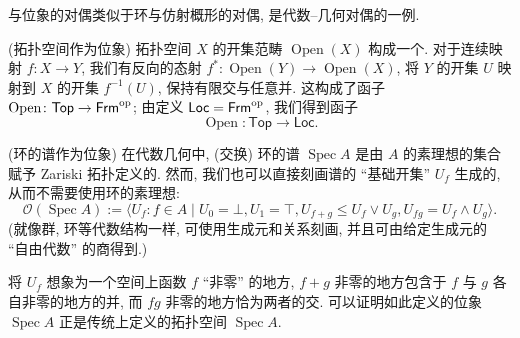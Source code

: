\begin{remark}
	{}
	\fm{}与位象的对偶类似于环与仿射概形的对偶,
	是代数--几何对偶的一例.
\end{remark}

\begin{example}
	{(拓扑空间作为位象)}
	拓扑空间 $X$ 的开集范畴 $\operatorname{Open}(X)$ 构成一个\fm{}.
	对于连续映射 $f \colon X \to Y$,
	我们有反向的\fm{}态射 $f^* \colon \operatorname{Open}(Y) \to \operatorname{Open}(X)$,
	将 $Y$ 的开集 $U$ 映射到 $X$ 的开集 $f^{-1}(U)$, 保持有限交与任意并.
	这构成了函子 $\operatorname{Open} \colon \mathsf {Top} \to \mathsf {Frm}^{\text{op}}$; 由定义 $\mathsf {Loc} = \mathsf {Frm}^{\text{op}}$, 我们得到函子 $$\operatorname{Open} \colon \mathsf {Top} \to \mathsf {Loc}.$$
\end{example}

\begin{example}
	{(环的谱作为位象)}
	在代数几何中, (交换) 环的谱 $\operatorname{Spec}A$ 是由 $A$ 的素理想的集合赋予 Zariski 拓扑定义的. 然而, 我们也可以直接刻画谱的 ``基础开集'' $U_f$ 生成的\fm, 从而不需要使用环的素理想\footnotemark:
	$$
	\mathcal O(\operatorname{Spec}A):= \big\langle U_f\colon f\in A\mid U_0 = \bot, U_1 = \top,
	U_{f+g} \leq U_f \vee U_g, U_{fg} = U_f \wedge U_g \big\rangle.
	$$
	(\fm{}就像群, 环等代数结构一样, 可使用生成元和关系刻画, 并且可由给定生成元的 ``自由代数'' 的商得到.)
	
	将 $U_f$ 想象为一个空间上函数 $f$ ``非零'' 的地方,
	$f+g$ 非零的地方包含于 $f$ 与 $g$ 各自非零的地方的并,
	而 $fg$ 非零的地方恰为两者的交.
	可以证明如此定义的位象 $\operatorname{Spec}A$ 正是传统上定义的拓扑空间 $\operatorname{Spec}A$.
\end{example}



